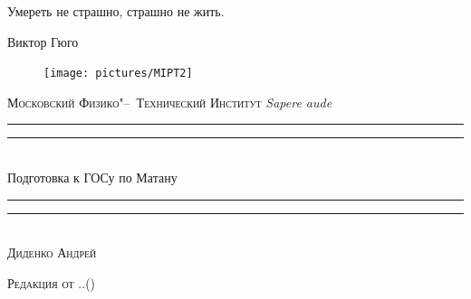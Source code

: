 \newpage
\thispagestyle{empty}
\epigraph{Умереть не страшно, страшно не жить.}{Виктор Гюго}\centering
\vspace*{-0.7\baselineskip}  
\settowidth{\unitlength}{\LARGE\scshape Московский Физико"--~Технический Институт}
\begin{figure}[!h]
\center
\texttt{[image: pictures/MIPT2]}
\vspace{-0.5\baselineskip}
\end{figure}
{\LARGE\scshape Московский Физико"--~Технический Институт}
{\large \itshape Sapere aude}\\[0.14\baselineskip]
\rule{\unitlength}{1.7pt}\vspace*{-\baselineskip}\vspace*{2pt}
\rule{\unitlength}{0.4pt}\\[0.6\baselineskip]
{\Huge Подготовка к ГОСу по Матану}\\[0.4\baselineskip]
\rule{\unitlength}{0.4pt}\vspace*{-1.5\baselineskip}\vspace{3.2pt}
\rule{\unitlength}{1.7pt}\\[0.55\baselineskip]
{\large\scshape Диденко Андрей \\\vspace*{0.1\baselineskip}  %
}\par
\vspace*{0.35\baselineskip}  

{\LARGE\scshape Редакция от \twodigit\day.\twodigit\month.\the\year \;(\currenttime)}\par 

